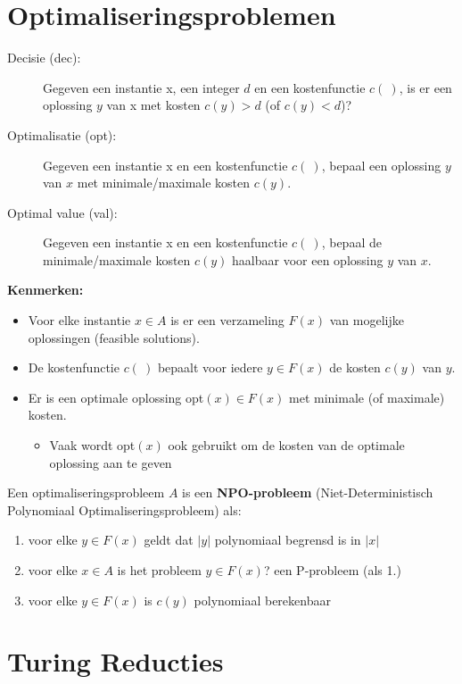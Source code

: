 \documentclass[]{article}
\begin{document}
\section*{Optimaliseringsproblemen}

\begin{description}
\item[Decisie (dec):] Gegeven een instantie x, een integer $d$ en een kostenfunctie $c(~)$, is er een oplossing $y$ van x met kosten $c(y) > d$ (of $c(y) < d$)?
\item[Optimalisatie (opt):] Gegeven een instantie x en een kostenfunctie $c(~)$, bepaal een oplossing $y$ van $x$ met minimale/maximale kosten $c(y)$.
\item[Optimal value (val):] Gegeven een instantie x en een kostenfunctie $c(~)$, bepaal de minimale/maximale kosten $c(y)$ haalbaar voor een oplossing $y$ van $x$.
\end{description}

\textbf{Kenmerken:}

\begin{itemize}
\item Voor elke instantie $x \in A$ is er een verzameling $F(x)$ van mogelijke oplossingen (feasible solutions).
\item De kostenfunctie $c(~)$ bepaalt voor iedere $y \in F(x)$ de kosten $c(y)$ van $y$.
\item Er is een optimale oplossing opt$(x) \in F(x)$ met minimale (of maximale) kosten.
\begin{itemize}
\item Vaak wordt opt$(x)$ ook gebruikt om de kosten van de optimale oplossing aan te geven
\end{itemize}
\end{itemize}

Een optimaliseringsprobleem $A$ is een \textbf{NPO-probleem} (Niet-Deterministisch Polynomiaal Optimaliseringsprobleem) als:

\begin{enumerate}
\item voor elke $y \in F(x)$ geldt dat $|y|$ polynomiaal begrensd is in $|x|$
\item voor elke $x \in A$ is het probleem $y \in F(x)$? een P-probleem (als 1.)
\item voor elke $y \in F(x)$ is $c(y)$ polynomiaal berekenbaar
\end{enumerate}

\section*{Turing Reducties}
\end{document}
